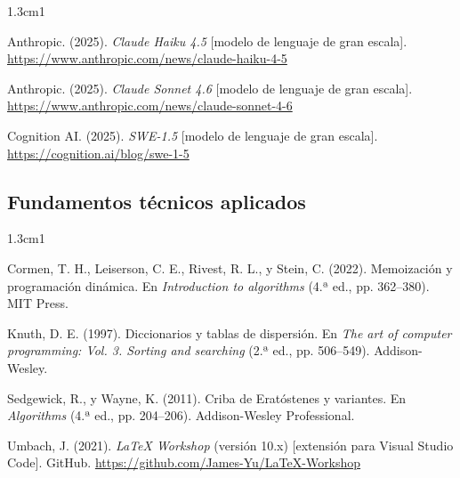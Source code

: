 \begin{hangparas}{1.3cm}{1}

Anthropic. (2025). \textit{Claude Haiku 4.5} [modelo de lenguaje de gran escala].
\url{https://www.anthropic.com/news/claude-haiku-4-5}

Anthropic. (2025). \textit{Claude Sonnet 4.6} [modelo de lenguaje de gran escala].
\url{https://www.anthropic.com/news/claude-sonnet-4-6}

Cognition AI. (2025). \textit{SWE-1.5} [modelo de lenguaje de gran escala].
\url{https://cognition.ai/blog/swe-1-5}

\end{hangparas}

\subsection{Fundamentos técnicos aplicados}

\begin{hangparas}{1.3cm}{1}

Cormen, T. H., Leiserson, C. E., Rivest, R. L., y Stein, C. (2022).
Memoización y programación dinámica. En
\textit{Introduction to algorithms} (4.ª ed., pp. 362--380). MIT Press.

Knuth, D. E. (1997).
Diccionarios y tablas de dispersión. En
\textit{The art of computer programming: Vol. 3. Sorting and searching}
(2.ª ed., pp. 506--549). Addison-Wesley.

Sedgewick, R., y Wayne, K. (2011).
Criba de Eratóstenes y variantes. En
\textit{Algorithms} (4.ª ed., pp. 204--206). Addison-Wesley Professional.

Umbach, J. (2021). \textit{LaTeX Workshop} (versión 10.x) [extensión para
Visual Studio Code]. GitHub.
\url{https://github.com/James-Yu/LaTeX-Workshop}

\end{hangparas}
